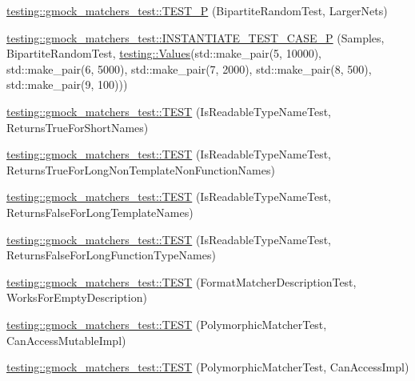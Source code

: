 \begin{DoxyCompactItemize}
\item 
\mbox{\hyperlink{namespacetesting_1_1gmock__matchers__test_ace6351a5a34b746491458140b06534ed}{testing\+::gmock\+\_\+matchers\+\_\+test\+::\+T\+E\+S\+T\+\_\+P}} (Bipartite\+Random\+Test, Larger\+Nets)
\item 
\mbox{\hyperlink{namespacetesting_1_1gmock__matchers__test_a857f48ffb1fc6f5ce61aec79b5c94da8}{testing\+::gmock\+\_\+matchers\+\_\+test\+::\+I\+N\+S\+T\+A\+N\+T\+I\+A\+T\+E\+\_\+\+T\+E\+S\+T\+\_\+\+C\+A\+S\+E\+\_\+P}} (Samples, Bipartite\+Random\+Test, \mbox{\hyperlink{namespacetesting_abd3c87b40c2a0663691c9b617ed5fcc2}{testing\+::\+Values}}(std\+::make\+\_\+pair(5, 10000), std\+::make\+\_\+pair(6, 5000), std\+::make\+\_\+pair(7, 2000), std\+::make\+\_\+pair(8, 500), std\+::make\+\_\+pair(9, 100)))
\item 
\mbox{\hyperlink{namespacetesting_1_1gmock__matchers__test_aef0bf5f855b1e75c63ec45408b5a23ba}{testing\+::gmock\+\_\+matchers\+\_\+test\+::\+T\+E\+ST}} (Is\+Readable\+Type\+Name\+Test, Returns\+True\+For\+Short\+Names)
\item 
\mbox{\hyperlink{namespacetesting_1_1gmock__matchers__test_a839515535e3e75d4f80ba6ae8f7347ec}{testing\+::gmock\+\_\+matchers\+\_\+test\+::\+T\+E\+ST}} (Is\+Readable\+Type\+Name\+Test, Returns\+True\+For\+Long\+Non\+Template\+Non\+Function\+Names)
\item 
\mbox{\hyperlink{namespacetesting_1_1gmock__matchers__test_ad1630d47de9f4fcdc00ab4962eaeea05}{testing\+::gmock\+\_\+matchers\+\_\+test\+::\+T\+E\+ST}} (Is\+Readable\+Type\+Name\+Test, Returns\+False\+For\+Long\+Template\+Names)
\item 
\mbox{\hyperlink{namespacetesting_1_1gmock__matchers__test_a30516b1c70e14132d1d87ab08b96aa2f}{testing\+::gmock\+\_\+matchers\+\_\+test\+::\+T\+E\+ST}} (Is\+Readable\+Type\+Name\+Test, Returns\+False\+For\+Long\+Function\+Type\+Names)
\item 
\mbox{\hyperlink{namespacetesting_1_1gmock__matchers__test_ae104f652fab7d1b3c3873f6987401481}{testing\+::gmock\+\_\+matchers\+\_\+test\+::\+T\+E\+ST}} (Format\+Matcher\+Description\+Test, Works\+For\+Empty\+Description)
\item 
\mbox{\hyperlink{namespacetesting_1_1gmock__matchers__test_ae29925e94a9396fe3c7fab6efaff8d8a}{testing\+::gmock\+\_\+matchers\+\_\+test\+::\+T\+E\+ST}} (Polymorphic\+Matcher\+Test, Can\+Access\+Mutable\+Impl)
\item 
\mbox{\hyperlink{namespacetesting_1_1gmock__matchers__test_a918a64c4594ef6b30f53d735c2e6e6ac}{testing\+::gmock\+\_\+matchers\+\_\+test\+::\+T\+E\+ST}} (Polymorphic\+Matcher\+Test, Can\+Access\+Impl)

\end{DoxyCompactItemize}
